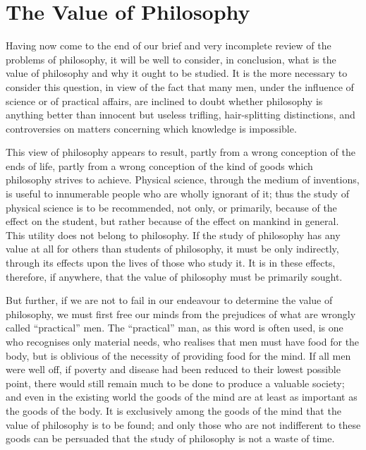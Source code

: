 
\author{Bertrand Russell}
\chapter{The Value of Philosophy}

Having now come to the end of our brief and very incomplete
review of the problems of philosophy, it will be well to consider, in
conclusion, what is the value of philosophy and why it ought to be
studied. It is the more necessary to consider this question, in view
of the fact that many men, under the influence of science or of
practical affairs, are inclined to doubt whether philosophy is
anything better than innocent but useless trifling, hair-splitting
distinctions, and controversies on matters concerning which knowledge
is impossible.

This view of philosophy appears to result, partly from a wrong
conception of the ends of life, partly from a wrong conception of the
kind of goods which philosophy strives to  achieve. Physical
science, through the medium of inventions, is useful to innumerable
people who are wholly ignorant of it; thus the study of physical
science is to be recommended, not only, or primarily, because of the
effect on the student, but rather because of the effect on mankind in
general. This utility does not belong to philosophy. If the study of
philosophy has any value at all for others than students of
philosophy, it must be only indirectly, through its effects upon the
lives of those who study it. It is in these effects, therefore, if
anywhere, that the value of philosophy must be primarily sought.

But further, if we are not to fail in our endeavour to determine the
value of philosophy, we must first free our minds from the prejudices
of what are wrongly called ``practical'' men. The ``practical'' man,
as this word is often used, is one who recognises only material needs,
who realises that men must have food for the body, but is oblivious of
the necessity of providing food for the mind. If all men were well
off, if poverty and disease had been reduced to their lowest possible
point, there  would still remain much to be done to produce
a valuable society; and even in the existing world the goods of the
mind are at least as important as the goods of the body. It is
exclusively among the goods of the mind that the value of philosophy
is to be found; and only those who are not indifferent to these goods
can be persuaded that the study of philosophy is not a waste of time.

